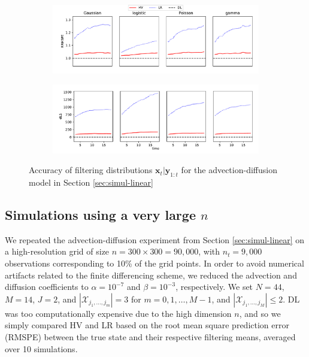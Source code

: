 \documentclass[12pt,letterpaper]{article}
\theoremstyle{propstyle}
\theoremstyle{propstyle}
\theoremstyle{propstyle}
\theoremstyle{propstyle}
\theoremstyle{propstyle}
\newcommand{\bx}{\mathbf{x}}
\newcommand{\by}{\mathbf{y}}
\newcommand{\sx}{\mathcal{X}}
\newcommand{\jm}{{j_1,\ldots,j_m}}
\newcommand{\jM}{{j_1,\ldots,j_M}}
\begin{document}
\begin{figure}[ht]
    \centering
    \begin{subfigure}{1.0\textwidth}
        \includegraphics[trim=0mm 6mm 0mm 0mm, clip,width=1.0\textwidth]{plots/linear-RRMSPE.pdf}
    \end{subfigure}
    \begin{subfigure}{1.0\textwidth}
        \includegraphics[trim=0mm 0mm 0mm 6mm, clip,width=1.0\textwidth]{plots/linear-dLS.pdf}
    \end{subfigure}
    \caption{Accuracy of filtering distributions $\bx_t | \by_{1:t}$ for the advection-diffusion model in Section \ref{sec:simul-linear}}
    \label{fig:linear-scores}
\end{figure}




\subsection{Simulations using a very large \texorpdfstring{$n$}{n}} \label{sec:big-simul}

We repeated the advection-diffusion experiment from Section \ref{sec:simul-linear} on a high-resolution grid of size $n=300 \times 300 = 90{,}000$, with $n_t=9{,}000$ observations corresponding to 10\% of the grid points. In order to avoid numerical artifacts related to the finite differencing scheme, we reduced the advection and diffusion coefficients to $\alpha = 10^{-7}$ and $\beta=10^{-3}$, respectively. We set $N=44$, $M=14$, $J=2$, and $|\sx_\jm| = 3$ for $m=0,1,\ldots,M-1$, and $|\sx_\jM| \leq 2$. DL was too computationally expensive due to the high dimension $n$, and so we simply compared HV and LR based on the root mean square prediction error (RMSPE) between the true state and their respective filtering means, averaged over 10 simulations.
\end{document}
